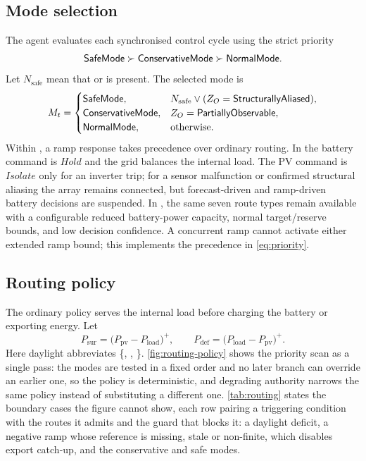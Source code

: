 \subsection{Mode selection}

The agent evaluates each synchronised control cycle using the strict priority
\begin{equation}
\label{eq:priority}
\textsf{SafeMode}\succ
\textsf{ConservativeMode}\succ
\textsf{NormalMode}.
\end{equation}
Let $N_{\mathrm{safe}}$ mean that  or  is present. The selected mode is
\begin{equation}
\label{eq:mode-selection}
M_t=
\begin{cases}
\textsf{SafeMode}, & N_{\mathrm{safe}}\vee
(Z_O=\textsf{StructurallyAliased}),\\
\textsf{ConservativeMode}, & Z_O=\textsf{PartiallyObservable},\\
\textsf{NormalMode}, & \text{otherwise}.
\end{cases}
\end{equation}
Within , a ramp response takes precedence over ordinary routing. In  the battery command is $Hold$ and the grid balances the internal load. The PV command is $Isolate$ only for an inverter trip; for a sensor malfunction or confirmed structural aliasing the array remains connected, but forecast-driven and ramp-driven battery decisions are suspended. In , the same seven route types remain available with a configurable reduced battery-power capacity, normal target/reserve bounds, and low decision confidence. A concurrent ramp cannot activate either extended ramp bound; this implements the precedence in \autoref{eq:priority}.

\subsection{Routing policy}

The ordinary policy serves the internal load before charging the battery or exporting energy. Let
\begin{equation}
\label{eq:surplus-deficit}
P_{\mathrm{sur}}=\lparen{}P_{\mathrm{pv}}-P_{\mathrm{load}}\rparen^{+},
\qquad
P_{\mathrm{def}}=\lparen{}P_{\mathrm{load}}-P_{\mathrm{pv}}\rparen^{+}.
\end{equation}
Here daylight abbreviates \{, , \}\@. \autoref{fig:routing-policy} shows the priority scan as a single pass: the modes are tested in a fixed order and no later branch can override an earlier one, so the policy is deterministic, and degrading authority narrows the same policy instead of substituting a different one\@. \autoref{tab:routing} states the boundary cases the figure cannot show, each row pairing a triggering condition with the routes it admits and the guard that blocks it: a daylight deficit, a negative ramp whose reference is missing, stale or non-finite, which disables export catch-up, and the conservative and safe modes.

